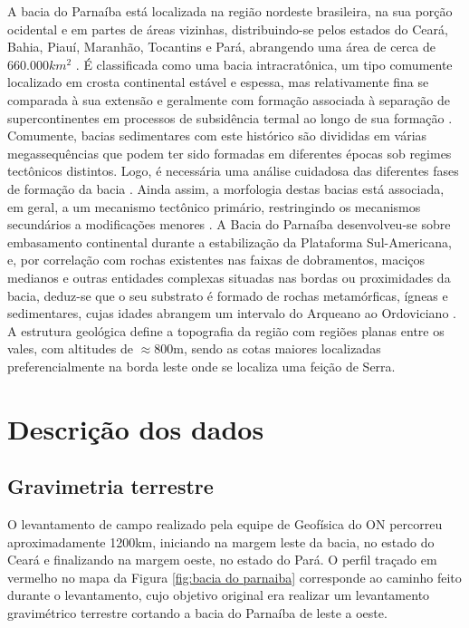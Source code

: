 A bacia do Parnaíba está localizada na região nordeste brasileira, na sua porção ocidental e em partes de áreas vizinhas, distribuindo-se pelos estados do Ceará, Bahia, Piauí, Maranhão, Tocantins e Pará, abrangendo uma área de cerca de $660.000km^{2}$ \cite{article_parnaiba}. É classificada como uma bacia intracratônica, um tipo  comumente localizado em crosta continental estável e espessa, mas relativamente fina se comparada à sua extensão e geralmente com formação associada à separação de supercontinentes em processos de subsidência termal ao longo de sua formação \cite{vaz2007_parnaiba}. Comumente, bacias sedimentares com este histórico são divididas em várias megassequências que podem ter sido formadas em diferentes épocas sob regimes tectônicos distintos. Logo, é necessária uma análise cuidadosa das diferentes fases de formação da bacia \cite{bacias_intracratonicas}. Ainda assim, a morfologia destas bacias está associada, em geral, a um mecanismo tectônico primário, restringindo os mecanismos secundários a modificações menores \cite{allen2012cratonic}. A Bacia do Parnaíba desenvolveu-se sobre embasamento continental durante a estabilização da Plataforma Sul-Americana, e, por correlação com rochas existentes nas faixas de dobramentos, maciços medianos e outras entidades complexas situadas nas bordas ou proximidades da bacia, deduz-se que o seu substrato é formado de rochas metamórficas, ígneas e sedimentares, cujas idades abrangem um intervalo do Arqueano ao Ordoviciano \cite{tese_bacia_parnaiba}. A estrutura geológica define a topografia da região com regiões planas entre os vales, com altitudes de  $\approx 800$m, sendo as cotas maiores localizadas preferencialmente na borda leste onde se localiza uma feição de Serra. 

\section{Descrição dos dados}

\subsection{Gravimetria terrestre}

O levantamento de campo realizado pela equipe de Geofísica do ON percorreu aproximadamente 1200km, iniciando na margem leste da bacia, no estado do Ceará e finalizando na margem oeste, no estado do Pará. O perfil traçado em vermelho no mapa da Figura \ref{fig:bacia do parnaiba} corresponde ao caminho feito durante o levantamento, cujo objetivo original era realizar um levantamento gravimétrico terrestre cortando a bacia do Parnaíba de leste a oeste.

